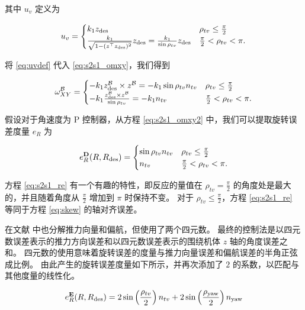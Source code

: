 \documentclass[conference]{IEEEtran}
\begin{document}
其中 $u_v$ 定义为

\begin{align}
  \label{eq:uvdef}
  u_v =
    \begin{cases}
    k_1 \zdes &  \rho_{tv} \leq \frac\pi2 \\
    \frac{k_1}{\sqrt{1 - (z^\top\zdes)^2}} \zdes =
    \frac{k_1}{\sin\rho_{tv}} \zdes &  \frac\pi2 < \rho_{tv} < \pi.
  \end{cases}
\end{align}

将 \eqref{eq:uvdef} 代入 \eqref{eq:s2s1_omxy}，我们得到 

\begin{align}
  \label{eq:s2s1_omxy2}
  \omega_{XY}^{\mathcal B} =
  \begin{cases}
    -k_1 \zdes^{\mathcal B} \times z^{\mathcal B} = -k_1 \sin\rho_{tv} n_{tv} &  \rho_{tv} \leq \frac\pi2 \\
    -k_1 \frac{\zdes^{\mathcal B} \times z^{\mathcal B}}{\sin\rho_{tv}} = -k_1 n_{tv} & \frac\pi2 < \rho_{tv} < \pi.
  \end{cases}
\end{align}

假设对于角速度为 P 控制器，从方程 \eqref{eq:s2s1_omxy2} 中，我们可以提取旋转误差度量 $e_R$ 为 

\begin{align}
  \label{eq:s2s1_re}
  e_R^{\textbf{D}}(R, \Rdes) =
   \begin{cases}
     \sin\rho_{tv} n_{tv} & \rho_{tv} \leq \frac\pi2 \\
     n_{tv} & \frac\pi2 < \rho_{tv} < \pi.
   \end{cases}
\end{align}

方程 \eqref{eq:s2s1_re} 有一个有趣的特性，即反应的量值在 $\rho_{tv} = \frac\pi2$ 的角度处是最大的，并且随着角度从 $\frac\pi2$ 增加到 $\pi$ 时保持不变。 
对于 $\rho_{tv} \leq \frac\pi2$，方程 \eqref{eq:s2s1_re} 等同于方程 \eqref{eq:skew} 的轴对齐误差。

在文献 \citet{brescianini_tilt-prioritized_2020} 中也分解推力向量和偏航，但使用了两个四元数。
最终的控制法是以四元数误差表示的推力方向误差和以四元数误差表示的围绕机体 $z$ 轴的角度误差之和。
四元数的使用意味着旋转误差的度量与推力向量误差和偏航误差的半角正弦成比例。
由此产生的旋转误差度量如下所示，并再次添加了 $2$ 的系数，以匹配与其他度量的线性化。

\begin{align}
  \label{eq:quat_decomp}
  e_R^{\textbf{E}}(R, \Rdes) = 2\sin\left(\frac{\rho_{tv}}{2}\right) n_{tv} + 2 \sin\left(\frac{\rho_{\text{yaw}}}{2}\right) n_{\text{yaw}}
\end{align}
\end{document}
